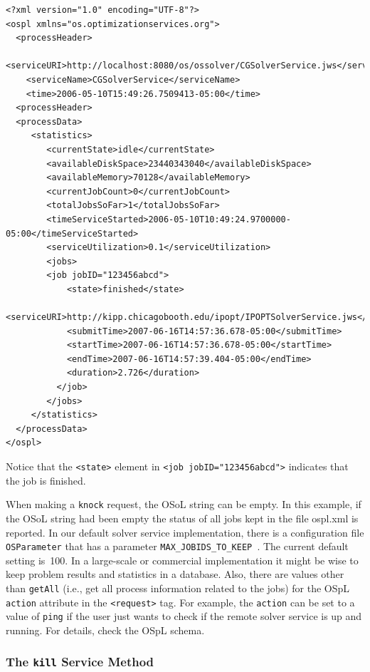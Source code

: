 \begin{verbatim}
<?xml version="1.0" encoding="UTF-8"?>
<ospl xmlns="os.optimizationservices.org">
  <processHeader>
    <serviceURI>http://localhost:8080/os/ossolver/CGSolverService.jws</serviceURI>
    <serviceName>CGSolverService</serviceName>
    <time>2006-05-10T15:49:26.7509413-05:00</time>
  <processHeader>
  <processData>
     <statistics>
        <currentState>idle</currentState>
        <availableDiskSpace>23440343040</availableDiskSpace>
        <availableMemory>70128</availableMemory>
        <currentJobCount>0</currentJobCount>
        <totalJobsSoFar>1</totalJobsSoFar>
        <timeServiceStarted>2006-05-10T10:49:24.9700000-05:00</timeServiceStarted>
        <serviceUtilization>0.1</serviceUtilization>
        <jobs>
        <job jobID="123456abcd">
            <state>finished</state>
            <serviceURI>http://kipp.chicagobooth.edu/ipopt/IPOPTSolverService.jws</serviceURI>
            <submitTime>2007-06-16T14:57:36.678-05:00</submitTime>
            <startTime>2007-06-16T14:57:36.678-05:00</startTime>
            <endTime>2007-06-16T14:57:39.404-05:00</endTime>
            <duration>2.726</duration>
          </job>
        </jobs>
     </statistics>
  </processData>
</ospl>
\end{verbatim}
Notice that the {\tt <state>} element in {\tt <job jobID="123456abcd">} indicates that the job is finished.

When making a {\tt knock} request,  the OSoL string can be empty. In this example, if the OSoL string had been empty
the status of all jobs kept in the file ospl.xml is reported.  In our default solver service implementation,
there is a configuration file {\tt OSParameter} that has a parameter {\tt MAX\_JOBIDS\_TO\_KEEP }.
The current default setting is~100. In a large-scale or commercial implementation it might be wise to keep
problem results and statistics in a database. Also, there are values other than {\tt getAll} (i.e., get all
process information related to the jobs) for the OSpL {\tt action} attribute in the {\tt <request>} tag.
For example, the {\tt action} can be set to a value of {\tt ping} if the user just wants
to check if the remote solver service is up and running. For details, check the OSpL schema.


\subsubsection{The  {\tt kill}   Service Method}

